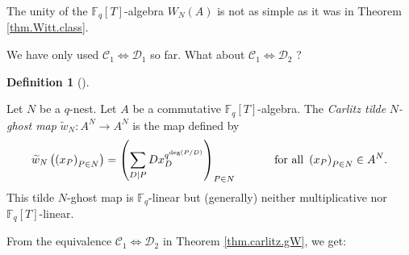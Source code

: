 \documentclass[numbers=enddot,12pt,final,onecolumn,notitlepage]{scrartcl}%
\theoremstyle{definition}
\newtheorem{defi}[theo]{Definition}
\newenvironment{definition}[1][]
{\begin{defi}[#1]\begin{leftbar}}
{\end{leftbar}\end{defi}}
\let\sumnonlimits\sum
\renewcommand{\sum}{\sumnonlimits\limits}
\begin{document}
The unity of the $\mathbb{F}_{q}\left[  T\right]  $-algebra $W_{N}\left(
A\right)  $ is not as simple as it was in Theorem \ref{thm.Witt.class}.

We have only used $\mathcal{C}_{1}\Longleftrightarrow\mathcal{D}_{1}$ so far.
What about $\mathcal{C}_{1}\Longleftrightarrow\mathcal{D}_{2}$ ?

\begin{definition}
\label{def.carlitz.Witt.ghostmap.tilde}Let $N$ be a $q$-nest. Let $A$ be a
commutative $\mathbb{F}_{q}\left[  T\right]  $-algebra. The \textit{Carlitz
tilde }$N$\textit{-ghost map} $\widetilde{w}_{N}:A^{N}\rightarrow A^{N}$ is
the map defined by%
\[
\widetilde{w}_{N}\left(  \left(  x_{P}\right)  _{P\in N}\right)  =\left(
\sum\limits_{D\mid P}Dx_{D}^{q^{\deg\left(  P / D\right)  }}\right)  _{P\in
N}\ \ \ \ \ \ \ \ \ \ \text{for all }\left(  x_{P}\right)  _{P\in N}\in
A^{N}.
\]
This tilde $N$-ghost map is $\mathbb{F}_{q}$-linear but (generally) neither
multiplicative nor $\mathbb{F}_{q}\left[  T\right]  $-linear.
\end{definition}

From the equivalence $\mathcal{C}_{1}\Longleftrightarrow\mathcal{D}_{2}$ in
Theorem \ref{thm.carlitz.gW}, we get:
\end{document}
